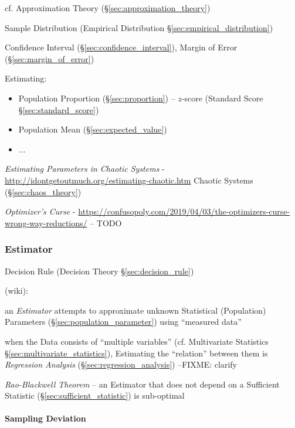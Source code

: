 \fist cf. Approximation Theory (\S\ref{sec:approximation_theory})

Sample Distribution (Empirical Distribution \S\ref{sec:empirical_distribution})

Confidence Interval (\S\ref{sec:confidence_interval}), Margin of Error
(\S\ref{sec:margin_of_error})

Estimating:
\begin{itemize}
  \item Population Proportion (\S\ref{sec:proportion}) -- $z$-score (Standard
    Score \S\ref{sec:standard_score})
  \item Population Mean (\S\ref{sec:expected_value})
  \item ...
\end{itemize}

\emph{Estimating Parameters in Chaotic Systems} -
\url{http://idontgetoutmuch.org/estimating-chaotic.htm} \fist Chaotic Systems
(\S\ref{sec:chaos_theory})

\asterism

\emph{Optimizer's Curse} -
\url{https://confusopoly.com/2019/04/03/the-optimizers-curse-wrong-way-reductions/}
-- TODO



\subsubsection{Estimator}\label{sec:estimator}

\fist Decision Rule (Decision Theory \S\ref{sec:decision_rule})

(wiki):

an \emph{Estimator} attempts to approximate unknown Statistical (Population)
Parameters (\S\ref{sec:population_parameter}) using ``measured data''

when the Data consists of ``multiple variables'' (cf. Multivariate Statistics
\S\ref{sec:multivariate_statistics}), Estimating the ``relation'' between them
is \emph{Regression Analysis} (\S\ref{sec:regression_analysis})
--FIXME: clarify

\emph{Rao-Blackwell Theorem} -- an Estimator that does not depend on a
Sufficient Statistic (\S\ref{sec:sufficient_statistic}) is sub-optimal



\paragraph{Sampling Deviation}\label{sec:sampling_deviation}\hfill

